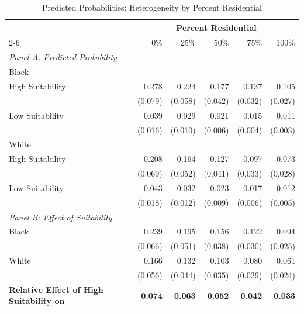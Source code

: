 \begin{table}[h]
\centering
\caption{Predicted Probabilities: Heterogeneity by Percent Residential}
\label{tab:predicted_outcomes/suitabilityxblackshare+pctres}
\begin{threeparttable}
\begin{tabular*}{1\textwidth}{@{\extracolsep{\fill}}lr@{\hspace{1.2em}}r@{\hspace{1.2em}}r@{\hspace{1.2em}}r@{\hspace{1.2em}}r@{\hspace{1.2em}}}
\toprule
 & \multicolumn{5}{c}{Percent Residential} \\
\cmidrule(l){2-6}
 & 0\% & 25\% & 50\% & 75\% & 100\% \\
\midrule
\textit{Panel A: Predicted Probability} & & & & & \\
\addlinespace[2pt]
Black & & & & & \\
\quad High Suitability & 0.278 & 0.224 & 0.177 & 0.137 & 0.105 \\
 & (0.079) & (0.058) & (0.042) & (0.032) & (0.027) \\[4pt]
\quad Low Suitability & 0.039 & 0.029 & 0.021 & 0.015 & 0.011 \\
 & (0.016) & (0.010) & (0.006) & (0.004) & (0.003) \\[4pt]
White & & & & & \\
\quad High Suitability & 0.208 & 0.164 & 0.127 & 0.097 & 0.073 \\
 & (0.069) & (0.052) & (0.041) & (0.033) & (0.028) \\[4pt]
\quad Low Suitability & 0.043 & 0.032 & 0.023 & 0.017 & 0.012 \\
 & (0.018) & (0.012) & (0.009) & (0.006) & (0.005) \\[4pt]
\midrule
\textit{Panel B: Effect of Suitability} & & & & & \\
\addlinespace[2pt]
Black & 0.239\rlap{$^{***}$} & 0.195\rlap{$^{***}$} & 0.156\rlap{$^{***}$} & 0.122\rlap{$^{***}$} & 0.094\rlap{$^{***}$} \\
 & (0.066) & (0.051) & (0.038) & (0.030) & (0.025) \\[4pt]
White & 0.166\rlap{$^{***}$} & 0.132\rlap{$^{***}$} & 0.103\rlap{$^{***}$} & 0.080\rlap{$^{***}$} & 0.061\rlap{$^{**}$} \\
 & (0.056) & (0.044) & (0.035) & (0.029) & (0.024) \\[4pt]
\addlinespace[2pt]
\textbf{Relative Effect of High Suitability on} & \textbf{0.074}\rlap{$^{*}$} & \textbf{0.063}\rlap{$^{*}$} & \textbf{0.052}\rlap{$^{*}$} & \textbf{0.042}\rlap{$^{*}$} & \textbf{0.033}\rlap{$^{*}$} \\

\end{tabular*}
\end{threeparttable}
\end{table}
